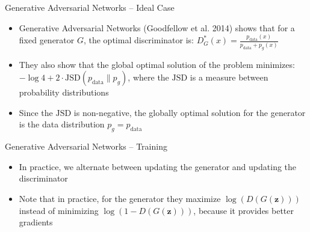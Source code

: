 \begin{frame}{Generative Adversarial Networks -- Ideal Case}
\protect\hypertarget{generative-adversarial-networks-ideal-case}{}

\begin{itemize}
\tightlist
\item
  Generative Adversarial Networks (Goodfellow et al. 2014) shows that
  for a fixed generator \(G\), the optimal discriminator is:
  \(D^{*}_{G}(x) = \frac{p_{\text{data}}(x)}{p_{\text{data}} + p_{g}(x)}\)
\item
  They also show that the global optimal solution of the problem
  minimizes:
  \(-\log 4 + 2 \cdot \text{JSD}(p_{\text{data}} \parallel p_g )\),
  where the \(\text{JSD}\) is a measure between probability
  distributions
\item
  Since the \(\text{JSD}\) is non-negative, the globally optimal
  solution for the generator is the data distribution
  \(p_g = p_{\text{data}}\)
\end{itemize}

\end{frame}

\begin{frame}{Generative Adversarial Networks -- Training}
\protect\hypertarget{generative-adversarial-networks-training}{}

\begin{itemize}
\tightlist
\item
  In practice, we alternate between updating the generator and updating
  the discriminator
\end{itemize}


\begin{itemize}
\tightlist
\item
  Note that in practice, for the generator they maximize
  \(\log (D(G(\boldsymbol{z})))\) instead of minimizing
  \(\log (1-D(G(\boldsymbol{z})))\), because it provides better
  gradients
\end{itemize}

\end{frame}

